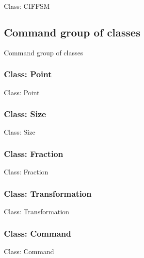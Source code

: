 \documentclass[11pt,twoside,openany,x11names,svgnames]{memoir}
\begin{document}
Class: CIFFSM

\subsection{Command group of classes}\label{Command-group-of-classes}

Command group of classes

\subsubsection{Class: Point}\label{Class-Point}

Class: Point

\subsubsection{Class: Size}\label{Class-Size}

Class: Size

\subsubsection{Class: Fraction}\label{Class-Fraction}

Class: Fraction

\subsubsection{Class: Transformation}\label{Class-Transformation}

Class: Transformation

\subsubsection{Class: Command}\label{Class-Command}

Class: Command
\end{document}
